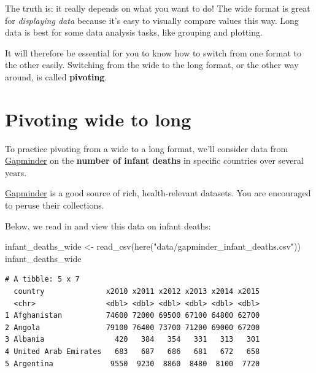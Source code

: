 \documentclass[
  letterpaper,
  DIV=11,
  numbers=noendperiod]{scrreprt}
\newenvironment{Shaded}{\begin{snugshade}}{\end{snugshade}}
\newcommand{\FunctionTok}[1]{\textcolor[rgb]{0.28,0.35,0.67}{#1}}
\newcommand{\NormalTok}[1]{\textcolor[rgb]{0.00,0.23,0.31}{#1}}
\newcommand{\OtherTok}[1]{\textcolor[rgb]{0.00,0.23,0.31}{#1}}
\newcommand{\StringTok}[1]{\textcolor[rgb]{0.13,0.47,0.30}{#1}}
\begin{document}
The truth is: it really depends on what you want to do! The wide format
is great for \emph{displaying data} because it's easy to visually
compare values this way. Long data is best for some data analysis tasks,
like grouping and plotting.

It will therefore be essential for you to know how to switch from one
format to the other easily. Switching from the wide to the long format,
or the other way around, is called \textbf{pivoting}.

\hypertarget{pivoting-wide-to-long}{%
\section{Pivoting wide to long}\label{pivoting-wide-to-long}}

To practice pivoting from a wide to a long format, we'll consider data
from \href{https://www.gapminder.org}{Gapminder} on the \textbf{number
of infant deaths} in specific countries over several years.

\begin{tcolorbox}[enhanced jigsaw, colframe=quarto-callout-note-color-frame, rightrule=.15mm, opacityback=0, breakable, coltitle=black, colbacktitle=quarto-callout-note-color!10!white, bottomrule=.15mm, leftrule=.75mm, toprule=.15mm, arc=.35mm, bottomtitle=1mm, colback=white, left=2mm, opacitybacktitle=0.6, titlerule=0mm, title=\textcolor{quarto-callout-note-color}{\faInfo}\hspace{0.5em}{Side Note}, toptitle=1mm]

\href{https://www.gapminder.org}{Gapminder} is a good source of rich,
health-relevant datasets. You are encouraged to peruse their
collections.

\end{tcolorbox}

Below, we read in and view this data on infant deaths:

\begin{Shaded}
\begin{Highlighting}[]
\NormalTok{infant\_deaths\_wide }\OtherTok{\textless{}{-}} \FunctionTok{read\_csv}\NormalTok{(}\FunctionTok{here}\NormalTok{(}\StringTok{"data/gapminder\_infant\_deaths.csv"}\NormalTok{))}
\NormalTok{infant\_deaths\_wide}
\end{Highlighting}
\end{Shaded}

\begin{verbatim}
# A tibble: 5 x 7
  country              x2010 x2011 x2012 x2013 x2014 x2015
  <chr>                <dbl> <dbl> <dbl> <dbl> <dbl> <dbl>
1 Afghanistan          74600 72000 69500 67100 64800 62700
2 Angola               79100 76400 73700 71200 69000 67200
3 Albania                420   384   354   331   313   301
4 United Arab Emirates   683   687   686   681   672   658
5 Argentina             9550  9230  8860  8480  8100  7720
\end{verbatim}
\end{document}
